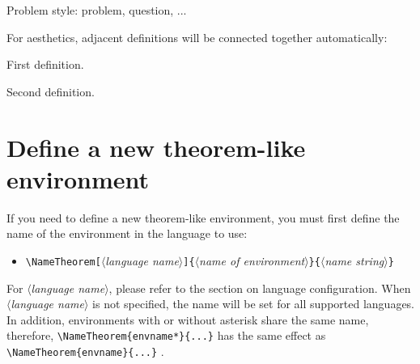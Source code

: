 \documentclass[allowbf]{beaulivre}
\providecommand{\meta}[1]{$\langle${\normalfont\itshape#1}$\rangle$}
\begin{document}
\begin{problem}
    Problem style: problem, question, ...
\end{problem}

\medskip
For aesthetics, adjacent definitions will be connected together automatically:
\begin{definition}
    First definition.
\end{definition}

\begin{definition}
    Second definition.
\end{definition}


\bigskip
\section{Define a new theorem-like environment}

If you need to define a new theorem-like environment, you must first define the name of the environment in the language to use:
\begin{itemize}
    \item \lstinline|\NameTheorem[|\meta{language name}\lstinline|]{|\meta{name of environment}\lstinline|}{|\meta{name string}\lstinline|}|
\end{itemize}
For \meta{language name}, please refer to the section on language configuration. When \meta{language name} is not specified, the name will be set for all supported languages. In addition, environments with or without asterisk share the same name, therefore, \lstinline|\NameTheorem{envname*}{...}| has the same effect as \lstinline|\NameTheorem{envname}{...}| .
\end{document}
